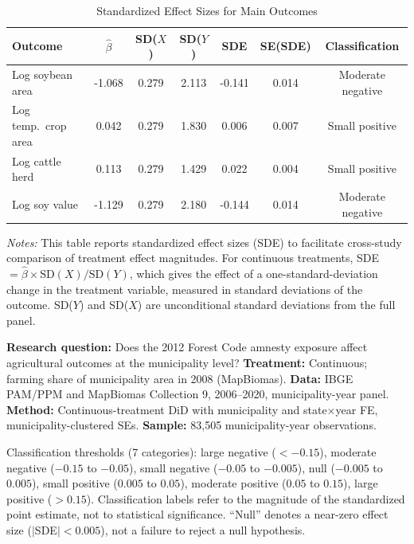 \begin{table}[H]
\centering
\caption{Standardized Effect Sizes for Main Outcomes}
\label{tab:sde}
\begin{tabular}{lcccccc}
\toprule
Outcome & $\hat{\beta}$ & SD($X$) & SD($Y$) & SDE & SE(SDE) & Classification \\
\midrule
Log soybean area & -1.068 & 0.279 & 2.113 & -0.141 & 0.014 & Moderate negative \\
Log temp.~crop area & 0.042 & 0.279 & 1.830 & 0.006 & 0.007 & Small positive \\
Log cattle herd & 0.113 & 0.279 & 1.429 & 0.022 & 0.004 & Small positive \\
Log soy value & -1.129 & 0.279 & 2.180 & -0.144 & 0.014 & Moderate negative \\
\bottomrule
\end{tabular}
\par\vspace{0.3em}
{\footnotesize \emph{Notes:} This table reports standardized effect sizes (SDE) to facilitate cross-study comparison of treatment effect magnitudes. For continuous treatments, SDE $= \hat{\beta} \times \text{SD}(X) / \text{SD}(Y)$, which gives the effect of a one-standard-deviation change in the treatment variable, measured in standard deviations of the outcome. SD($Y$) and SD($X$) are unconditional standard deviations from the full panel.

\textbf{Research question:} Does the 2012 Forest Code amnesty exposure affect agricultural outcomes at the municipality level? \textbf{Treatment:} Continuous; farming share of municipality area in 2008 (MapBiomas). \textbf{Data:} IBGE PAM/PPM and MapBiomas Collection 9, 2006--2020, municipality-year panel. \textbf{Method:} Continuous-treatment DiD with municipality and state$\times$year FE, municipality-clustered SEs. \textbf{Sample:} 83,505 municipality-year observations.

Classification thresholds (7 categories): large negative ($< -0.15$), moderate negative ($-0.15$ to $-0.05$), small negative ($-0.05$ to $-0.005$), null ($-0.005$ to $0.005$), small positive ($0.005$ to $0.05$), moderate positive ($0.05$ to $0.15$), large positive ($> 0.15$). Classification labels refer to the magnitude of the standardized point estimate, not to statistical significance. ``Null'' denotes a near-zero effect size ($|$SDE$| < 0.005$), not a failure to reject a null hypothesis.}
\end{table}

